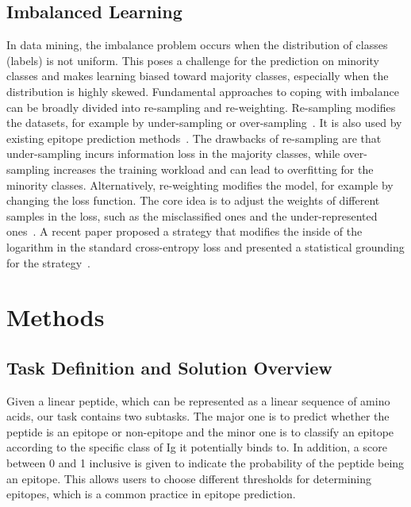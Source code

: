 \documentclass[runningheads]{llncs}
\begin{document}
\subsection{Imbalanced Learning}
In data mining, the imbalance problem occurs when the distribution of classes (labels) is not uniform. This poses a challenge for the prediction on minority classes and makes learning biased toward majority classes, especially when the distribution is highly skewed. Fundamental approaches to coping with imbalance can be broadly divided into re-sampling and re-weighting. Re-sampling modifies the datasets, for example by under-sampling or over-sampling~\cite{kang2019decoupling}. It is also used by existing epitope prediction methods~\cite{gupta2013identification,liu2020deep}. The drawbacks of re-sampling are that under-sampling incurs information loss in the majority classes, while over-sampling increases the training workload and can lead to overfitting for the minority classes. Alternatively, re-weighting modifies the model, for example by changing the loss function. The core idea is to adjust the weights of different samples in the loss, such as the misclassified ones and the under-represented ones~\cite{cui2019class,lin2017focal}. A recent paper proposed a strategy that modifies the inside of the logarithm in the standard cross-entropy loss and presented a statistical grounding for the strategy~\cite{menon2020long}.

\section{Methods}
\subsection{Task Definition and Solution Overview}
Given a linear peptide, which can be represented as a linear sequence of amino acids, our task contains two subtasks. The major one is to predict whether the peptide is an epitope or non-epitope and the minor one is to classify an epitope according to the specific class of Ig it potentially binds to. In addition, a score between 0 and 1 inclusive is given to indicate the probability of the peptide being an epitope. This allows users to choose different thresholds for determining epitopes, which is a common practice in epitope prediction.
\end{document}

